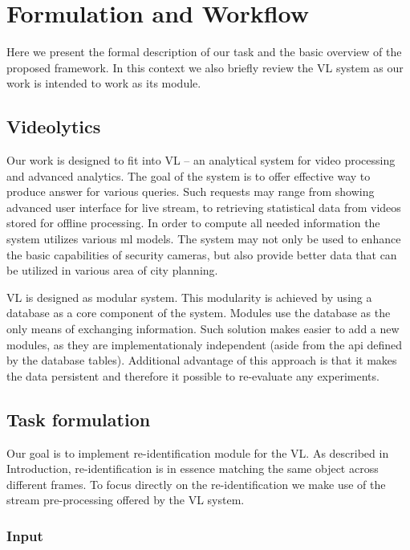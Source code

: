 \chapter{Formulation and Workflow}

Here we present the formal description of our task and the basic overview of
the proposed framework. In this context we also briefly review the \gls{VL}
system as our work is intended to work as its module.

\section{Videolytics}

Our work is designed to fit into \gls{VL}  -- an analytical system
for video processing and advanced analytics. The goal of the system is to offer
effective way to produce answer for various queries. Such requests may range
from showing advanced user interface for live stream, to retrieving statistical
data from videos stored for offline processing. In order to compute all needed
information the system utilizes various \gls{ml} models. The
system may not only be used to enhance the basic capabilities of security
cameras, but also provide better data that can be utilized in various area of
city planning.

\Gls{VL} is designed as modular system. This modularity is achieved by using
a database as a core component of the system. Modules use the database as the
only means of exchanging information. Such solution makes easier to add a new
modules, as they are implementationaly independent (aside from the
\gls{api} defined by the database tables). Additional advantage of this
approach is that it makes the data persistent and therefore it possible to
re-evaluate any experiments.

\section{Task formulation}

Our goal is to implement re-identification module for the \gls{VL}. As
described in Introduction, re-identification is in essence matching the
same object across different frames. To focus directly on the re-identification
we make use of the stream pre-processing offered by the \gls{VL} system.

\subsection{Input}

